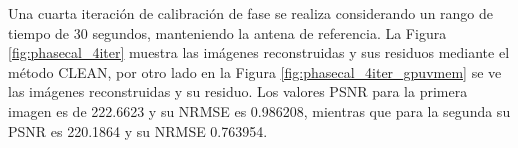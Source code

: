 Una cuarta iteración de calibración de fase se realiza considerando un rango de tiempo de 30 segundos, manteniendo la antena de referencia. La Figura \ref{fig:phasecal_4iter} muestra las imágenes reconstruidas y sus residuos mediante el método CLEAN, por otro lado en la Figura \ref{fig:phasecal_4iter_gpuvmem} se ve las imágenes reconstruidas y su residuo. Los valores PSNR para la primera imagen es de 222.6623 y su NRMSE es 0.986208, mientras que para la segunda su PSNR es 220.1864 y su NRMSE 0.763954. 


\begin{figure}[!ht]
 \centering
    \vspace{0.3cm}

\end{figure}
